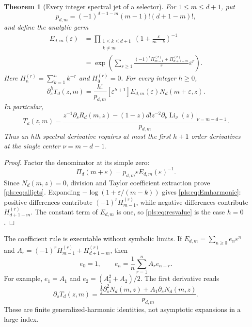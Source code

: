\documentclass[11pt,letterpaper]{article}
\numberwithin{equation}{section}
\newtheorem{theorem}{Theorem}[section]
\theoremstyle{definition}
\theoremstyle{remark}\newtheorem{remark}[theorem]{Remark}
\newcommand{\Li}{\operatorname{Li}}
\begin{document}
\begin{theorem}[Every integer spectral jet of a selector]
\label{pls:thm:jets}
For $1\le m\le d+1$, put
\begin{equation}\label{pls:eq:pm}
 p_{d,m}=(-1)^{d+1-m}(m-1)!(d+1-m)!,
\end{equation}
and define the analytic germ
\begin{align}
 E_{d,m}(\varepsilon)
 &=\prod_{\substack{1\le k\le d+1\\k\ne m}}
                  \left(1+\frac{\varepsilon}{m-k}\right)^{-1}
                  \label{pls:eq:Em}\\
 &=\exp\left(\sum_{r\ge1}
 \frac{(-1)^rH_{m-1}^{(r)}+H_{d+1-m}^{(r)}}r
                                     \varepsilon^r\right).
                  \label{pls:eq:Emharmonic}
\end{align}
Here $H_n^{(r)}=\sum_{k=1}^n k^{-r}$ and $H_0^{(r)}=0$.
For every integer $h\ge0$,
\begin{equation}\label{pls:eq:alljets}
 \boxed{\displaystyle
 \partial_s^hT_d(z,m)=\frac{h!}{p_{d,m}}
 [\varepsilon^{h+1}]
          E_{d,m}(\varepsilon)N_d(m+\varepsilon,z).}
\end{equation}
In particular,
\begin{equation}\label{pls:eq:resvalue}
 T_d(z,m)=\frac{z^{-1}\partial_sR_d(m,z)
   -(1-z)d!z^{-2}\left.\partial_\nu\Li_\nu(z)
                                    \right|_{\nu=m-d-1}}
                      {p_{d,m}}.
\end{equation}
Thus an $h$th spectral derivative requires at most the first $h+1$
order derivatives at the single center $\nu=m-d-1$.
\end{theorem}
\begin{proof}
Factor the denominator at its simple zero:
\[
 \Pi_d(m+\varepsilon)
   =p_{d,m}\varepsilon E_{d,m}(\varepsilon)^{-1}.
\]
Since $N_d(m,z)=0$, division and Taylor coefficient extraction prove
\eqref{pls:eq:alljets}. Expanding
$-\log(1+\varepsilon/(m-k))$ gives
\eqref{pls:eq:Emharmonic}: positive differences contribute
$(-1)^rH_{m-1}^{(r)}$, while negative differences contribute
$H_{d+1-m}^{(r)}$. The constant term of $E_{d,m}$ is one, so
\eqref{pls:eq:resvalue} is the case $h=0$.
\end{proof}

The coefficient rule is executable without symbolic limits. If
$E_{d,m}=\sum_{n\ge0}e_n\varepsilon^n$ and
$A_r=(-1)^rH_{m-1}^{(r)}+H_{d+1-m}^{(r)}$, then
\begin{equation}\label{pls:eq:ecoef}
 e_0=1,\qquad e_n=\frac1n\sum_{r=1}^n A_r e_{n-r}.
\end{equation}
For example, $e_1=A_1$ and $e_2=(A_1^2+A_2)/2$.
The first derivative reads
\[
 \partial_sT_d(z,m)
 =\frac{\tfrac12\partial_s^2N_d(m,z)
               +A_1\partial_sN_d(m,z)}{p_{d,m}}.
\]
These are finite generalized-harmonic identities, not asymptotic
expansions in a large index.
\end{document}
